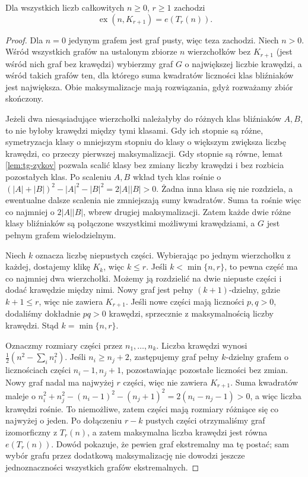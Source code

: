 \begin{twierdzenie}
\label{thm:tg-turan}
Dla wszystkich liczb całkowitych $n\geq0$, $r\geq1$ zachodzi
\[
\operatorname{ex}(n,K_{r+1})=e(T_r(n)).
\]
\end{twierdzenie}
\begin{proof}
Dla $n=0$ jedynym grafem jest graf pusty,
więc teza zachodzi. Niech $n>0$.
Wśród wszystkich grafów na ustalonym zbiorze
$n$ wierzchołków bez $K_{r+1}$ (jest wśród nich
graf bez krawędzi) wybierzmy graf $G$
o największej liczbie krawędzi,
a wśród takich grafów ten, dla którego
suma kwadratów liczności klas bliźniaków
jest największa. Obie maksymalizacje mają
rozwiązania, gdyż rozważamy zbiór skończony.

Jeżeli dwa niesąsiadujące wierzchołki
należałyby do różnych klas bliźniaków
$A,B$, to nie byłoby krawędzi między
tymi klasami. Gdy ich stopnie są różne,
symetryzacja klasy o mniejszym stopniu
do klasy o większym zwiększa liczbę krawędzi,
co przeczy pierwszej maksymalizacji.
Gdy stopnie są równe, lemat
\ref{lem:tg-zykov} pozwala scalić klasy
bez zmiany liczby krawędzi
i bez rozbicia pozostałych klas.
Po scaleniu $A,B$ wkład tych klas rośnie o
$(|A|+|B|)^2-|A|^2-|B|^2=2|A||B|>0$.
Żadna inna klasa się nie rozdziela, a ewentualne
dalsze scalenia nie zmniejszają sumy kwadratów.
Suma ta rośnie więc co najmniej o $2|A||B|$,
wbrew drugiej maksymalizacji.
Zatem każde dwie różne klasy bliźniaków
są połączone wszystkimi możliwymi
krawędziami, a $G$ jest pełnym grafem
wielodzielnym.

Niech $k$ oznacza liczbę niepustych części.
Wybierając po jednym wierzchołku z każdej,
dostajemy klikę $K_k$, więc $k\leq r$.
Jeśli $k<\min\{n,r\}$, to pewna część
ma co najmniej dwa wierzchołki.
Możemy ją rozdzielić na dwie niepuste
części i dodać krawędzie między nimi.
Nowy graf jest pełny $(k+1)$-dzielny, gdzie
$k+1\leq r$, więc nie zawiera $K_{r+1}$.
Jeśli nowe części mają liczności $p,q>0$,
dodaliśmy dokładnie $pq>0$ krawędzi, sprzecznie
z maksymalnością liczby krawędzi.
Stąd $k=\min\{n,r\}$.

Oznaczmy rozmiary części przez $n_1,\ldots,n_k$.
Liczba krawędzi wynosi
$\frac12(n^2-\sum_i n_i^2)$.
Jeśli $n_i\geq n_j+2$,
zastępujemy graf pełny $k$-dzielny grafem
o licznościach części $n_i-1,n_j+1$,
pozostawiając pozostałe liczności bez zmian.
Nowy graf nadal ma najwyżej $r$ części, więc
nie zawiera $K_{r+1}$. Suma kwadratów maleje o
$n_i^2+n_j^2-(n_i-1)^2-(n_j+1)^2
=2(n_i-n_j-1)>0$, a więc liczba krawędzi rośnie.
To niemożliwe, zatem części mają rozmiary
różniące się co najwyżej o jeden.
Po dołączeniu $r-k$ pustych części otrzymaliśmy
graf izomorficzny z $T_r(n)$, a zatem
maksymalna liczba krawędzi jest równa $e(T_r(n))$.
Dowód pokazuje, że pewien graf ekstremalny ma tę postać;
sam wybór grafu przez dodatkową maksymalizację
nie dowodzi jeszcze jednoznaczności wszystkich
grafów ekstremalnych.
\end{proof}

